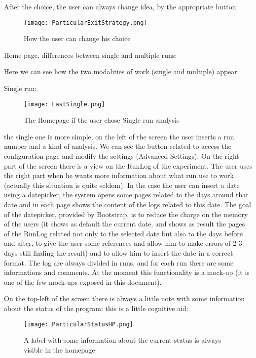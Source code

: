 After the choice, the user can always change idea, by the appropriate button:

\begin{figure}[H]
\centering
\texttt{[image: ParticularExitStrategy.png]} 
\caption{How the user can change his choice}
\end{figure}

\newpage
Home page, differences between single and multiple runs:

Here we can see how the two modalities of work (single and multiple) appear.

Single run: 
\begin{figure}[H]
\centering
\texttt{[image: LastSingle.png]} 
\caption{The Homepage if the user chose Single run analysis}
\end{figure}

the single one is more simple, on the left of the screen the user inserts a run number and a kind of analysis. We can see the button related to access the configuration page and modify the settings (Advanced Settings). On the right part of the screen there is a view on the RunLog of the experiment. The user uses the right part when he wants more information about what run use to work (actually this situation is quite seldom). In the case the user can insert a date using a datepicker, the system opens some pages related to the days around that date and in each page shows the content of the logs related to this date. The goal of the datepicker, provided by Bootstrap, is to reduce the charge on the memory of the users (it shows as default the current date, and shows as result the pages of the RunLog related not only to the selected date but also to the days before and after, to give the user some references and allow him to make errors of 2-3 days still finding the result) and to allow him to insert the date in a correct format. The log are always divided in runs, and for each run there are some informations and comments. At the moment this functionality is a mock-up (it is one of the few  mock-ups exposed in this document). 

On the top-left of the screen there is always a little note with some information about the status of the program: this is a little cognitive aid:


\begin{figure}[H]
\centering
\texttt{[image: ParticularStatusHP.png]} 
\caption{A label with some information about the current status is always visible in the homepage}
\end{figure}    
 


